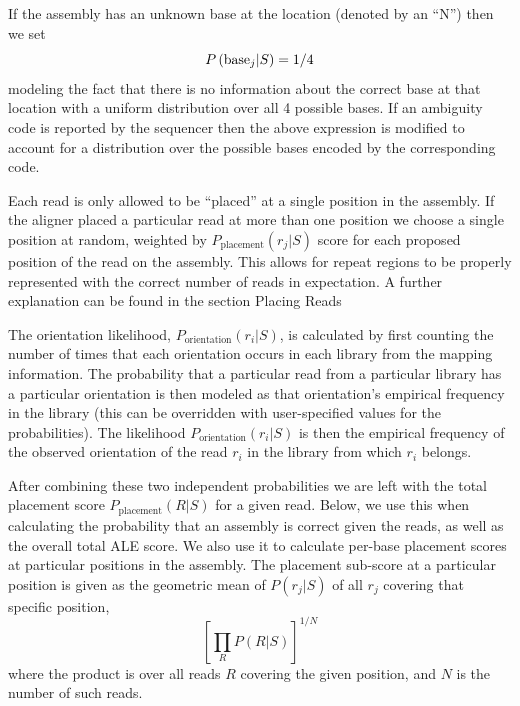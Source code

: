 \documentclass[phd,tocprelim]{cornell}
\begin{document}
If the assembly has an unknown base at the location (denoted by an “N”) then we set
\begin{equation}
    P\left({\rm base}_{j}|S\right) = 1/4
\end{equation}
modeling the fact that there is no information about the correct base at that location with a uniform distribution over all 4 possible bases. If an ambiguity code is reported by the sequencer then the above expression is modified to account for a distribution over the possible bases encoded by the corresponding code.

Each read is only allowed to be “placed” at a single position in the assembly. If the aligner placed a particular read at more than one position we choose a single position at random, weighted by $P_{\text{placement}}(r_{j}|S)$ score for each proposed position of the read on the assembly. This allows for repeat regions to be properly represented with the correct number of reads in expectation. A further explanation can be found in the section Placing Reads

The orientation likelihood, $P_{\text{orientation}}\left(r_{i}|S\right)$, is calculated by first counting the number of times that each orientation occurs in each library from the mapping information.  The probability that a particular read from a particular library has a particular orientation is then modeled as that orientation’s empirical frequency in the library (this can be overridden with user-specified values for the probabilities).   The likelihood $P_{\text{orientation}}\left(r_{i}|S\right)$ is then the empirical frequency of the observed orientation of the read $r_{i}$ in the library from which $r_{i}$ belongs.

After combining these two independent probabilities we are left with the total placement score $P_{\text{placement}}(R|S)$ for a given read.  Below, we use this when calculating the probability that an assembly is correct given the reads, as well as the overall total ALE score.  We also use it to calculate per-base placement scores at particular positions in the assembly.  The placement sub-score at a particular position is given as the geometric mean of $P(r_{j}|S)$ of all $r_{j}$ covering that specific position,
\begin{equation}
    \left[\prod_{R}P(R|S)\right]^{1/N}
\end{equation}
where the product is over all reads $R$ covering the given position, and $N$ is the number of such reads.

\end{document}
